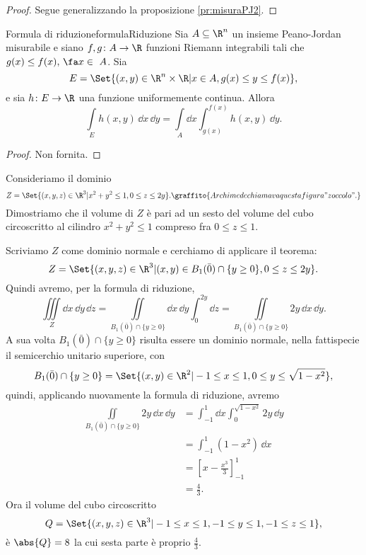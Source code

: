 \begin{proof}
	Segue generalizzando la proposizione \ref{pr:misuraPJ2}.
\end{proof}

\begin{teor}{Formula di riduzione}{formulaRiduzione}
	Sia \(A\subseteq \R^n\) un insieme Peano-Jordan misurabile e siano \(f,g\colon A \to \R\) funzioni Riemann integrabili tali che \(g(x) \le f(x),\,\fa x\in\ A\).
	Sia
	\[
		E = \Set{(x,y)\in\R^n \times \R | x\in A, g(x) \le y \le f(x)},
	\]
	e sia \(h\colon E \to \R\) una funzione uniformemente continua.
	Allora
	\[
		\int\limits_E h(x,y)\,\dd x\,\dd y = \int\limits_A \dd x\int_{g(x)}^{f(x)}h(x,y)\,\dd y.
	\]
\end{teor}

\begin{proof}
	Non fornita.
\end{proof}

\begin{ese}
	Consideriamo il dominio
	\[
		Z = \Set{(x,y,z) \in \R^3 | x^2+y^2 \le 1, 0\le z \le 2y}.\graffito{Archimede chiamava questa figura "zoccolo".}
	\]
	Dimostriamo che il volume di \(Z\) è pari ad un sesto del volume del cubo circoscritto al cilindro \(x^2+y^2 \le 1\) compreso fra \(0 \le z \le 1\).

	Scriviamo \(Z\) come dominio normale e cerchiamo di applicare il teorema:
	\[
		Z = \Set{(x,y,z) \in \R^3 | (x,y) \in B_1(\bar{0})\cap\{y \ge 0\}, 0 \le z \le 2y}.
	\]
	Quindi avremo, per la formula di riduzione,
	\[
		\iiint\limits_Z \dd x\,\dd y\,\dd z = \iint\limits_{B_1(\bar{0})\cap\{y \ge 0\}}\dd x\,\dd y \int_0^{2y}\dd z = \iint\limits_{B_1(\bar{0})\cap\{y \ge 0\}} 2y\,\dd x\,\dd y.
	\]
	A sua volta \(B_1(\bar{0})\cap\{y \ge 0\}\) risulta essere un dominio normale, nella fattispecie il semicerchio unitario superiore, con
	\[
		B_1(\bar{0})\cap \{y \ge 0\} = \Set{(x,y)\in\R^2 | -1 \le x \le 1, 0 \le y \le \sqrt{1-x^2}},
	\]
	quindi, applicando nuovamente la formula di riduzione, avremo
	\[
		\begin{split}
			\iint\limits_{B_1(\bar{0})\cap\{y \ge 0\}} 2y\,\dd x\,\dd y & = \int_{-1}^1 \dd x \int_0^{\sqrt{1-x^2}} 2y\,\dd y\\
			& =\int_{-1}^1 (1-x^2)\,\dd x \\
			& = \left[x- \frac{x^3}{3}\right]_{-1}^1\\
			& = \frac{4}{3}.
		\end{split}
	\]
	Ora il volume del cubo circoscritto
	\[
		Q = \Set{(x,y,z)\in\R^3 | -1 \le x \le 1, -1 \le y \le 1, -1 \le z \le 1},
	\]
	è \(\abs{Q} = 8\) la cui sesta parte è proprio \(\frac{4}{3}\).
\end{ese}

